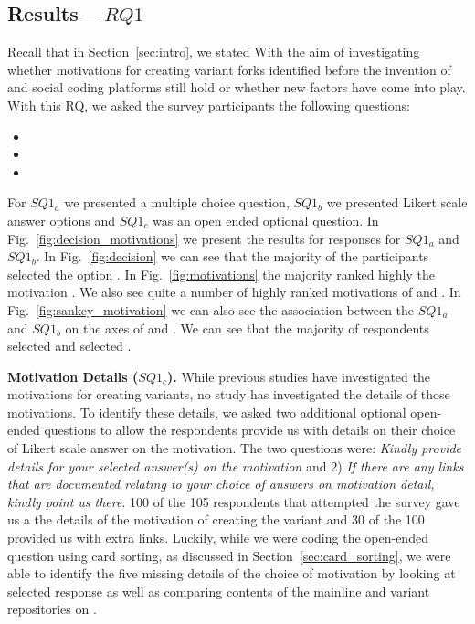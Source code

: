 \subsection{Results -- $RQ1$}
Recall that in Section~\ref{sec:intro}, we stated 
\textbf{\rqOne} With the aim of investigating whether motivations for creating variant forks identified before the invention of \git and social coding platforms
still hold or whether new factors have come into play.
With this RQ, we asked the survey participants the following questions:

\begin{itemize}
\item \rqOneOne
\item \rqOneTwo
\item \rqOneThree
\end{itemize}


For $SQ1_{a}$ we presented a multiple choice question, $SQ1_{b}$ we presented Likert scale answer options and $SQ1_{c}$ was an open ended optional question.
In Fig.~\ref{fig:decision_motivations} we present the results for responses for $SQ1_{a}$ and $SQ1_{b}$. In Fig.~\ref{fig:decision} we can see that the majority of the participants selected the option . In Fig.~\ref{fig:motivations} the majority ranked highly the motivation . We also see quite a number of highly ranked motivations of  and . In Fig.~\ref{fig:sankey_motivation} we can also see the association between the $SQ1_{a}$ and $SQ1_{b}$ on the axes of  and . We can see that the majority of respondents selected  and selected .


\nd \textbf{Motivation Details ($SQ1_{c}$).} While previous studies have investigated the motivations for creating variants, no study has investigated the details of those motivations.
To identify these details, we asked two additional optional open-ended questions to allow the respondents provide us with details on their choice of Likert scale answer on the motivation. The two questions were: \emph{Kindly provide details for your selected answer(s) on the motivation} and 2) \emph{If there are any links that are documented relating to your choice of answers on motivation detail, kindly point us there}. 100 of the 105 respondents that attempted the survey gave us a the details of the motivation of creating the variant and 30 of the 100 provided us with extra links. Luckily, while we were coding the open-ended question using card sorting, as discussed in Section~\ref{sec:card_sorting}, we were able to identify the five missing details of the choice of motivation by looking at selected response as well as comparing contents of the mainline and variant repositories on \gh.

